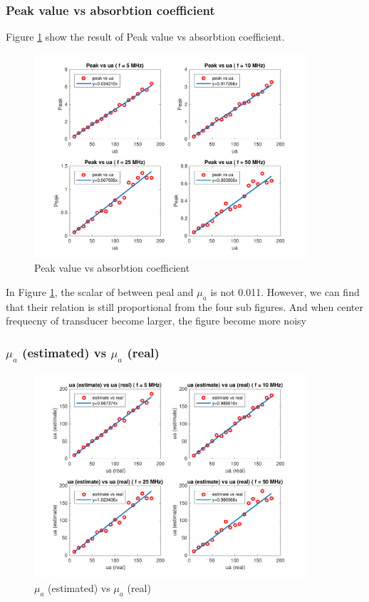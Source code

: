 \documentclass{article}
\begin{document}
\subsubsection{Peak value vs absorbtion coefficient}
Figure \ref{fig:p1f-1} show the result of Peak value vs absorbtion coefficient.
\begin{figure}[H]
    \centering
    \includegraphics[width=0.9\textwidth]{src/p1f-1.pdf}
    \caption{Peak value vs absorbtion coefficient}
    \label{fig:p1f-1}
\end{figure}
In Figure \ref{fig:p1f-1}, the scalar of between peal and $\mu_a$ is not 0.011. However, we can find that their relation is still 
proportional from the four sub figures. And when center frequecny of transducer become larger, the figure become more noisy

\subsubsection{$\mu_a$ (estimated) vs $\mu_a$ (real)}
\begin{figure}[H]
    \centering
    \includegraphics[width=0.9\textwidth]{src/p1f-2.pdf}
    \caption{$\mu_a$ (estimated) vs $\mu_a$ (real)}
    \label{fig:p1f-2}
\end{figure}
\end{document}
